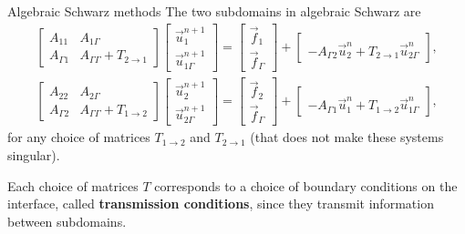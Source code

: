 \documentclass{beamer}
\begin{document}
\begin{frame}{Algebraic Schwarz methods}
The two subdomains in algebraic Schwarz are
\begin{align*}
	\begin{bmatrix} A_{11} & A_{1 \Gamma} \\ A_{\Gamma 1} & A_{\Gamma \Gamma} + T_{2 \to 1} \end{bmatrix}
                            \begin{bmatrix} \vec{u}_1^{n+1} \\ \vec{u}_{1 \Gamma}^{n+1} \end{bmatrix}
                            = \begin{bmatrix} \vec{f}_1 \\ \vec{f}_\Gamma \end{bmatrix}
                            + \begin{bmatrix} ~ \\ -A_{\Gamma 2} \vec{u}_2^n + T_{2 \to 1} \vec{u}_{2 \Gamma}^n \end{bmatrix}, \\
       \begin{bmatrix} A_{22} & A_{2 \Gamma} \\ A_{\Gamma 2} & A_{\Gamma \Gamma} + T_{1 \to 2} \end{bmatrix}
                            \begin{bmatrix} \vec{u}_2^{n+1} \\ \vec{u}_{2 \Gamma}^{n+1} \end{bmatrix}
                            = \begin{bmatrix} \vec{f}_2 \\ \vec{f}_\Gamma \end{bmatrix}
                            + \begin{bmatrix} ~ \\ -A_{\Gamma 1} \vec{u}_1^n + T_{1 \to 2} \vec{u}_{1 \Gamma}^n \end{bmatrix} ,
\end{align*}
for any choice of matrices $T_{1 \to 2}$ and $T_{2 \to 1}$ (that does not make these systems singular).

Each choice of matrices $T$ corresponds to a choice of boundary conditions on the interface, called \textbf{transmission conditions}, since they transmit information between subdomains.
\end{frame}
\end{document}
